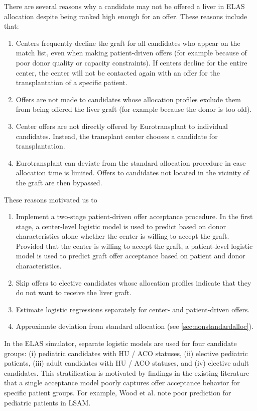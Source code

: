 \documentclass[11pt,twoside,]{book}
\begin{document}
There are several reasons why a candidate may not be offered a liver in
ELAS allocation despite being ranked high enough for an offer. These
reasons include that:

\begin{enumerate}
\def\labelenumi{\arabic{enumi}.}
\item
  Centers frequently decline the graft for all candidates who appear
  on the match list, even when making patient-driven offers (for
  example because of poor donor quality or capacity constraints). If centers decline for the entire center, the center will not be contacted again with an offer for the transplantation of a specific patient.
\item
  Offers are not made to candidates whose allocation profiles exclude
  them from being offered the liver graft (for
  example because the donor is too old).
\item
  Center offers are not directly offered by Eurotransplant to individual candidates.
  Instead, the transplant center chooses a candidate for transplantation.
\item
  Eurotransplant can deviate from the standard allocation procedure in
  case allocation time is limited. Offers
  to candidates not located in the vicinity of the graft are then
  bypassed.
\end{enumerate}

These reasons motivated us to

\begin{enumerate}
\def\labelenumi{\arabic{enumi}.}
\item
  Implement a two-stage patient-driven offer acceptance procedure. In
  the first stage, a center-level logistic model is used to predict
  based on donor characteristics alone whether the center is willing
  to accept the graft. Provided that the center is willing to accept
  the graft, a patient-level logistic model is used to predict graft
  offer acceptance based on patient and donor characteristics.
\item
  Skip offers to elective candidates whose allocation profiles indicate that they do not want to receive the liver graft.
\item
  Estimate logistic regressions separately for center- and
  patient-driven offers.
\item
  Approximate deviation from standard allocation (see \ref{sec:nonstandardalloc}).
\end{enumerate}

In the ELAS simulator, separate logistic models are used for four candidate groups:
(i) pediatric candidates
with HU / ACO statuses, (ii) elective pediatric patients, (iii) adult
candidates with HU / ACO statuses, and (iv) elective adult candidates.
This stratification is motivated by findings in the existing
literature that a single acceptance model poorly captures offer
acceptance behavior for specific patient groups. For example, Wood et al.
\citep{WoodPEDLSAM2021} note poor prediction for pediatric patients in LSAM.
\end{document}
